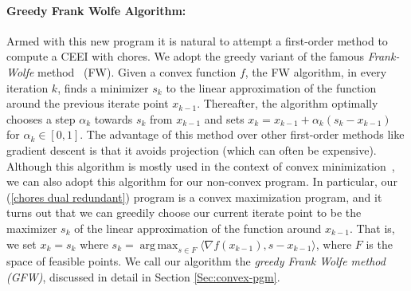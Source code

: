 \documentclass[format=acmsmall,authorversion]{acmart}
\newcommand{\argmax}{{\operatorname{\mathrm{arg\,max}}}}
\begin{document}
\paragraph{Greedy Frank Wolfe Algorithm:} Armed with this new program it is natural to attempt a first-order method to compute a CEEI with chores. We adopt the greedy variant of the famous \emph{Frank-Wolfe} method~\citep{frank1956algorithm} (FW). Given a convex function $f$, the FW algorithm, in every iteration $k$, finds a minimizer $s_k$ to the linear approximation of the function around the previous iterate point $x_{k-1}$. Thereafter, the algorithm optimally chooses a step $\alpha_k$ towards $s_k$ from $x_{k-1}$ and sets $x_{k} = x_{k-1} + \alpha_k (s_k - x_{k-1})$ for $\alpha_k \in  [0,1]$. The advantage of this method over other first-order methods like gradient descent is that it avoids projection (which can often be expensive). Although this algorithm is mostly used in the context of convex minimization~\cite{jaggi2013revisiting}, we can also adopt this algorithm for our non-convex program. In particular, our (\ref{chores dual redundant}) program is a convex maximization program, and it turns out that we can greedily choose our current iterate point to be the maximizer $s_k$ of the linear approximation of the function around $x_{k-1}$. That is, we set $x_k=s_k$ where $s_k = \argmax_{s \in F} \langle \nabla f(x_{k-1}), s - x_{k-1} \rangle$, where $F$ is the space of feasible points. We call our algorithm the \emph{greedy Frank Wolfe method (GFW)}, discussed in detail in Section \ref{Sec:convex-pgm}. 
\end{document}
